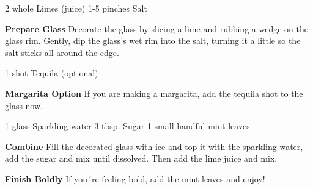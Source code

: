 \documentclass{article}
\begin{document}
\dishType{\drink}
\dishOther{\vegan}

\begin{step}
2 whole Limes (juice)
1-5 pinches Salt

\method
\textbf{Prepare Glass} Decorate the glass by slicing a lime and rubbing a wedge on the glass rim. Gently, dip the glass's wet rim into the salt, turning it a little so the salt sticks all around the edge.
\end{step}

\begin{step}
1 shot Tequila (optional)

\method
\textbf{Margarita Option} If you are making a margarita, add the tequila shot to the glass now.
\end{step}

\begin{step}
1 glass Sparkling water
3 tbsp. Sugar
1 small handful mint leaves

\method
\textbf{Combine} Fill the decorated glass with ice and top it with the sparkling water, add the sugar and mix until dissolved. Then add the lime juice and mix.

\textbf{Finish Boldly} If you´re feeling bold, add the mint leaves and enjoy!
\end{step}

\end{document}
